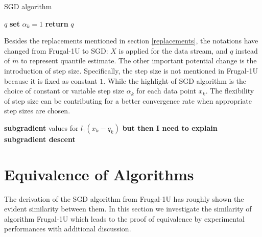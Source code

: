 \begin{algorithm}
    \caption{SGD algorithm}\label{alg:SGD}
    \begin{algorithmic}[1]
         $q$                 
                              
                \State \textbf{set} $\alpha_k = 1$  
                                  
                \Else                           {}
                \EndIf
            \EndFor
        \State \textbf{return} $q$              
    \end{algorithmic}
\end{algorithm}
Besides the replacements mentioned in section \ref{replacements}, the notations have changed from Frugal-1U to SGD: 
$X$ is applied for the data stream, and $q$ instead of $\tilde{m}$ to represent quantile estimate. The other important potential change is the introduction of step size. Specifically, the step size is not mentioned in Frugal-1U because it is fixed as constant $1$. While the highlight of SGD algorithm is the choice of constant or variable step size $\alpha_k$ for each data point $x_k$. The flexibility of step size can be contributing for a better convergence rate when appropriate step sizes are chosen.


\textbf{subgradient} values for $l_\tau(x_k - q_k)$ 
{\color{red} \textbf{but then I need to explain subgradient descent}} 
\section{Equivalence of Algorithms}
\label{sec: algo_equivalence}

The derivation of the SGD algorithm from Frugal-1U has roughly shown the evident similarity between them. In this section we investigate the similarity of algorithm Frugal-1U which leads to the proof of equivalence by experimental performances with additional discussion.




